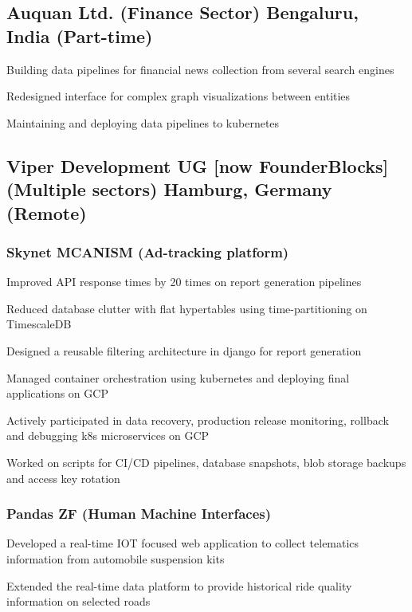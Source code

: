 \documentclass[letter,10pt]{article}
\begin{document}

\subsection{Auquan Ltd. (Finance Sector) \hfill Bengaluru, India (Part-time)}
\begin{zitemize}
\item Building data pipelines for financial news collection from several search engines
\item Redesigned interface for complex graph visualizations between entities
\item Maintaining and deploying data pipelines to kubernetes
\end{zitemize}


\subsection{Viper Development UG [now FounderBlocks] (Multiple sectors) \hfill Hamburg, Germany (Remote)}

\vspace{1em}
\subsubsection*{Skynet MCANISM (Ad-tracking platform)}
\begin{zitemize}
\item Improved API response times by 20 times on report generation pipelines
\item Reduced database clutter with flat hypertables using time-partitioning on TimescaleDB
\item Designed a reusable filtering architecture in django for report generation
\item Managed container orchestration using kubernetes and deploying final applications on GCP
\item Actively participated in data recovery, production release monitoring, rollback and debugging k8s microservices on GCP
\item Worked on scripts for CI/CD pipelines, database snapshots, blob storage backups and access key rotation
\end{zitemize}

\subsubsection*{Pandas ZF (Human Machine Interfaces)}
\begin{zitemize}
\item Developed a real-time IOT focused web application to collect telematics information from automobile suspension kits
\item Extended the real-time data platform to provide historical ride quality information on selected roads
\end{zitemize}
\end{document}
